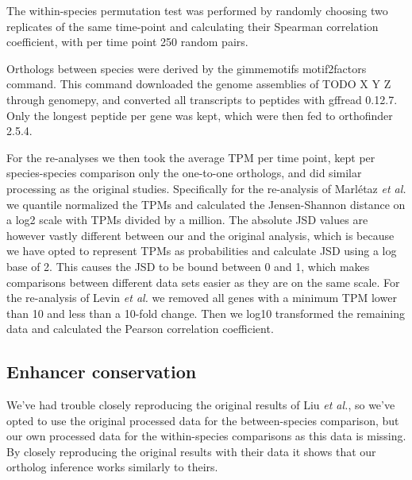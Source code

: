 The within-species permutation test was performed by randomly choosing two replicates of the same time-point and calculating their Spearman correlation coefficient, with per time point 250 random pairs.

Orthologs between species were derived by the gimmemotifs motif2factors command. This command downloaded the genome assemblies of TODO X Y Z through genomepy\cite{Frlich2023}, and converted all transcripts to peptides with gffread 0.12.7\cite{Pertea2020}. Only the longest peptide per gene was kept, which were then fed to orthofinder 2.5.4\cite{Emms2019}.

For the re-analyses we then took the average TPM per time point, kept per species-species comparison only the one-to-one orthologs, and did similar processing as the original studies. Specifically for the re-analysis of Marl\'etaz \textit{et al.} we quantile normalized\cite{qnorm} the TPMs and calculated the Jensen-Shannon distance on a log2 scale with TPMs divided by a million. The absolute JSD values are however vastly different between our and the original analysis, which is because we have opted to represent TPMs as probabilities and calculate JSD using a log base of 2. This causes the JSD to be bound between 0 and 1, which makes comparisons between different data sets easier as they are on the same scale. For the re-analysis of Levin \textit{et al.} we removed all genes with a minimum TPM lower than 10 and less than a 10-fold change. Then we log10 transformed the remaining data and calculated the Pearson correlation coefficient.

\subsection{Enhancer conservation}

We've had trouble closely reproducing the original results of Liu \textit{et al.}, so we've opted to use the original processed data for the between-species comparison, but our own processed data for the within-species comparisons as this data is missing. By closely reproducing the original results with their data it shows that our ortholog inference works similarly to theirs.

